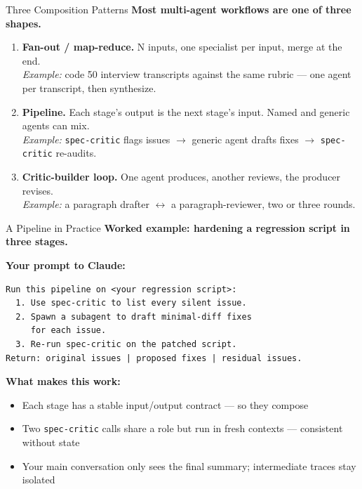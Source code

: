 \documentclass[aspectratio=169, 11pt]{beamer}
\begin{document}
\begin{frame}{Three Composition Patterns}
  \textbf{Most multi-agent workflows are one of three shapes.}

  \vspace{0.7em}
  \begin{enumerate}
    \item \textbf{Fan-out / map-reduce.} N inputs, one specialist per input, merge at the end.\\
    \emph{Example:} code 50 interview transcripts against the same rubric --- one agent per transcript, then synthesize.

    \vspace{0.5em}
    \item \textbf{Pipeline.} Each stage's output is the next stage's input. Named and generic agents can mix.\\
    \emph{Example:} \texttt{spec-critic} flags issues $\to$ generic agent drafts fixes $\to$ \texttt{spec-critic} re-audits.

    \vspace{0.5em}
    \item \textbf{Critic-builder loop.} One agent produces, another reviews, the producer revises.\\
    \emph{Example:} a paragraph drafter $\leftrightarrow$ a paragraph-reviewer, two or three rounds.
  \end{enumerate}
\end{frame}

\begin{frame}[fragile]{A Pipeline in Practice}
  \textbf{Worked example: hardening a regression script in three stages.}

  \vspace{0.3em}
  \textbf{Your prompt to Claude:}
  \begin{lstlisting}[basicstyle=\ttfamily\scriptsize]
Run this pipeline on <your regression script>:
  1. Use spec-critic to list every silent issue.
  2. Spawn a subagent to draft minimal-diff fixes
     for each issue.
  3. Re-run spec-critic on the patched script.
Return: original issues | proposed fixes | residual issues.
  \end{lstlisting}

  \vspace{0.3em}
  \textbf{What makes this work:}
  \begin{itemize}\small
    \item Each stage has a stable input/output contract --- so they compose
    \item Two \texttt{spec-critic} calls share a role but run in fresh contexts --- consistent without state
    \item Your main conversation only sees the final summary; intermediate traces stay isolated
  \end{itemize}

\end{frame}
\end{document}
